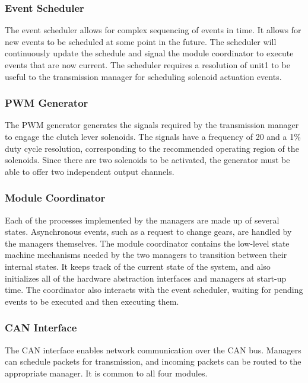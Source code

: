 \subsubsection{Event Scheduler}

The event scheduler allows for complex sequencing of events in time. It allows for new events to be scheduled at some point in the future.
The scheduler will continuously update the schedule and signal the module coordinator to execute events that are now current. The scheduler requires a resolution of unit{1}{\milli\second} to be useful to the transmission manager for scheduling solenoid actuation events.

\subsubsection{PWM Generator}

The PWM generator generates the signals required by the transmission manager to engage the clutch lever solenoids. The signals have a frequency of \unit{20}{\hertz} and a 1\% duty cycle resolution, corresponding to the recommended operating region of the solenoids. Since there are two solenoids to be activated, the generator must be able to offer two independent output channels.

\subsubsection{Module Coordinator}

Each of the processes implemented by the managers are made up of several states. Asynchronous events, such as a request to change gears, are handled by the managers themselves. The module coordinator contains the low-level state machine mechanisms needed by the two managers to transition between their internal states. It keeps track of the current state of the system, and also initializes all of the hardware abstraction interfaces and managers at start-up time. The coordinator also interacts with the event scheduler, waiting for pending events to be executed and then executing them.

\subsubsection{CAN Interface}

The CAN interface enables network communication over the CAN bus. Managers can schedule packets for transmission, and incoming packets can be routed to the appropriate manager. It is common to all four modules.

